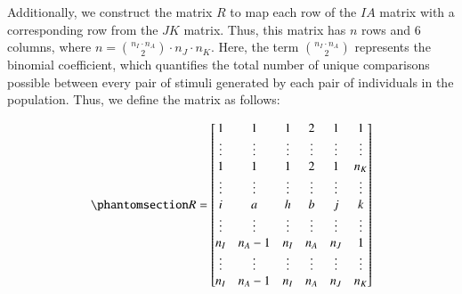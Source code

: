 \documentclass[
  authoryear,
  review,
  1p]{elsarticle}
\begin{document}
Additionally, we construct the matrix \(R\) to map each row of the
\(IA\) matrix with a corresponding row from the \(JK\) matrix. Thus,
this matrix has \(n\) rows and \(6\) columns, where
\(n = {n_{I} \cdot n_{A} \choose 2} \cdot n_{J} \cdot n_{K}\). Here, the
term \({n_{I} \cdot n_{A} \choose 2}\) represents the binomial
coefficient, which quantifies the total number of unique comparisons
possible between every pair of stimuli generated by each pair of
individuals in the population. Thus, we define the matrix as follows:

\begin{equation}\phantomsection\label{eq-mat12}{
R = \begin{bmatrix}
1 & 1 & 1 & 2 & 1 & 1 \\
\vdots & \vdots & \vdots & \vdots & \vdots & \vdots\\
1 & 1 & 1 & 2 & 1 & n_{K} \\
\vdots & \vdots & \vdots & \vdots & \vdots & \vdots\\
i & a & h & b & j & k \\
\vdots & \vdots & \vdots & \vdots & \vdots & \vdots\\
n_{I} & n_{A}-1 & n_{I} & n_{A} & n_{J} & 1 \\
\vdots & \vdots & \vdots & \vdots & \vdots & \vdots\\
n_{I} & n_{A}-1 & n_{I} & n_{A} & n_{J} & n_{K}
\end{bmatrix}
}\end{equation}
\end{document}
